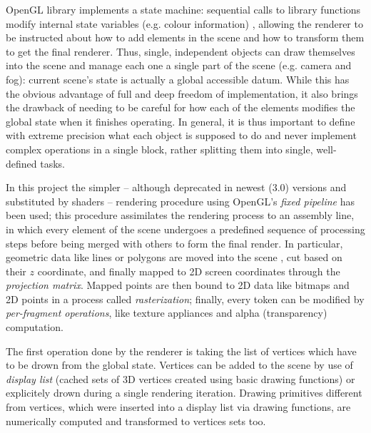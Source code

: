 OpenGL library implements a state machine: sequential calls to library
functions modify internal state variables (e.g. colour information) , allowing the renderer to be
instructed about how to add elements in the scene and how to transform them to
get the final renderer. Thus, single, independent objects can draw themselves
into the scene and manage each one a single part of the scene (e.g. camera and
fog): current scene's state is actually a global accessible datum. While this
has the obvious advantage of full and deep freedom of implementation, it also
brings the drawback of needing to be careful for how each of the elements
modifies the global state when it finishes operating. In general, it is thus
important to define with extreme precision what each object is supposed to do
and never implement complex operations in a single block, rather splitting them
into single, well-defined tasks.

In this project the simpler -- although deprecated in newest (3.0) versions and
substituted by shaders --
rendering procedure using OpenGL's \emph{fixed pipeline} has been used; this
procedure assimilates the rendering process to an assembly line, in which every
element of the scene undergoes a predefined sequence of processing steps before
being merged with others to form the final render. In particular, geometric data
like lines or polygons are moved into the scene , cut based on their $z$ coordinate, and
finally mapped to 2D screen coordinates through the \emph{projection matrix}.
Mapped points are then bound to 2D data like bitmaps and 2D points in a
process called \emph{rasterization}; finally, every token can be modified by
\emph{per-fragment operations}, like texture appliances and alpha (transparency)
computation.

The first operation done by the renderer is taking the list of vertices
which have to be drown from the global state. Vertices can be added to the
scene by use of \emph{display list} (cached sets of 3D vertices created using
basic drawing functions) or explicitely drown during a single rendering
iteration. Drawing primitives different from vertices, which were inserted into a
display list via drawing functions, are numerically computed and transformed to
vertices sets too.

